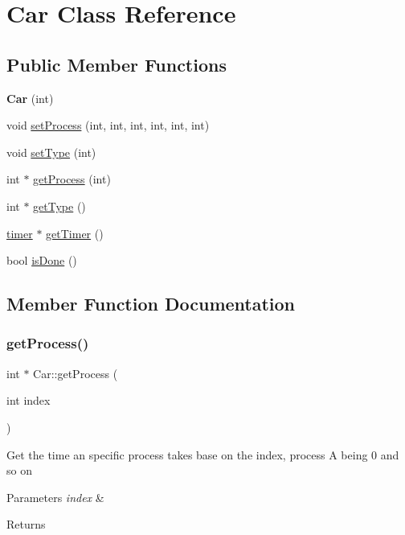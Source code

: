 \hypertarget{class_car}{}\section{Car Class Reference}
\label{class_car}
\subsection*{Public Member Functions}
\begin{DoxyCompactItemize}
\item 
\mbox{\label{class_car_a712e9d46304d34a0c35e38184c400a35}} 
{\bfseries Car} (int)
\item 
void \mbox{\hyperlink{class_car_a231f37919a88d434119f897efbebeaf3}{set\+Process}} (int, int, int, int, int, int)
\item 
void \mbox{\hyperlink{class_car_a577954053d9a27526ec1e5fbe4cbabd4}{set\+Type}} (int)
\item 
int $\ast$ \mbox{\hyperlink{class_car_a70fdfc2872daea9cde1a29b80a54de2a}{get\+Process}} (int)
\item 
int $\ast$ \mbox{\hyperlink{class_car_a0ce6ed79b6d381a497edf7ddff6192d5}{get\+Type}} ()
\item 
\mbox{\hyperlink{classtimer}{timer}} $\ast$ \mbox{\hyperlink{class_car_a47c5f8f522ab36d22f9b70521da89356}{get\+Timer}} ()
\item 
bool \mbox{\hyperlink{class_car_a63876f3d899700e7ba60f51d71a85b23}{is\+Done}} ()
\end{DoxyCompactItemize}


\subsection{Member Function Documentation}
\mbox{\label{class_car_a70fdfc2872daea9cde1a29b80a54de2a}} 
\subsubsection{\texorpdfstring{getProcess()}{getProcess()}}
{\footnotesize\ttfamily int $\ast$ Car\+::get\+Process (\begin{DoxyParamCaption}\item[{int}]{index }\end{DoxyParamCaption})}

Get the time an specific process takes base on the index, process A being 0 and so on 
\begin{DoxyParams}{Parameters}
{\em index} & \\
\hline
\end{DoxyParams}
\begin{DoxyReturn}{Returns}

\end{DoxyReturn}
\mbox{\label{class_car_a47c5f8f522ab36d22f9b70521da89356}} 
